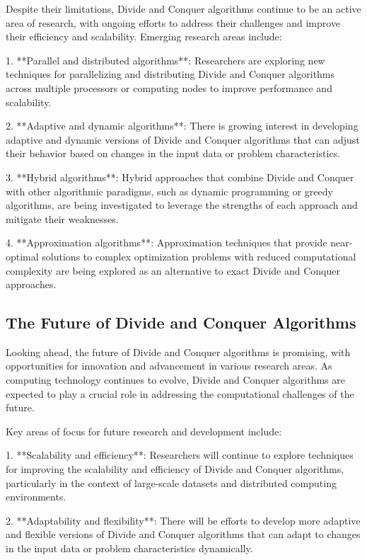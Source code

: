 \documentclass[12pt]{book} %
\begin{document}
Despite their limitations, Divide and Conquer algorithms continue to be an active area of research, with ongoing efforts to address their challenges and improve their efficiency and scalability. Emerging research areas include:

1. **Parallel and distributed algorithms**: Researchers are exploring new techniques for parallelizing and distributing Divide and Conquer algorithms across multiple processors or computing nodes to improve performance and scalability.

2. **Adaptive and dynamic algorithms**: There is growing interest in developing adaptive and dynamic versions of Divide and Conquer algorithms that can adjust their behavior based on changes in the input data or problem characteristics.

3. **Hybrid algorithms**: Hybrid approaches that combine Divide and Conquer with other algorithmic paradigms, such as dynamic programming or greedy algorithms, are being investigated to leverage the strengths of each approach and mitigate their weaknesses.

4. **Approximation algorithms**: Approximation techniques that provide near-optimal solutions to complex optimization problems with reduced computational complexity are being explored as an alternative to exact Divide and Conquer approaches.

\subsection{The Future of Divide and Conquer Algorithms}

Looking ahead, the future of Divide and Conquer algorithms is promising, with opportunities for innovation and advancement in various research areas. As computing technology continues to evolve, Divide and Conquer algorithms are expected to play a crucial role in addressing the computational challenges of the future.

Key areas of focus for future research and development include:

1. **Scalability and efficiency**: Researchers will continue to explore techniques for improving the scalability and efficiency of Divide and Conquer algorithms, particularly in the context of large-scale datasets and distributed computing environments.

2. **Adaptability and flexibility**: There will be efforts to develop more adaptive and flexible versions of Divide and Conquer algorithms that can adapt to changes in the input data or problem characteristics dynamically.
\end{document}
